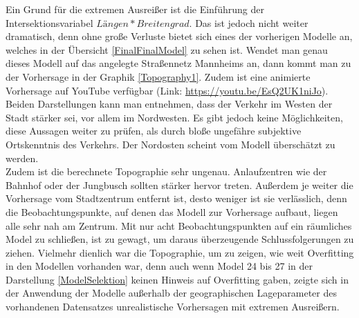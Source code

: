 \documentclass[a4paper,12pt]{thesis}
\begin{document}
Ein Grund für die extremen Ausreißer ist die Einführung der Intersektionsvariabel $Längen*Breitengrad$. Das ist jedoch nicht weiter dramatisch, denn ohne große Verluste bietet sich eines der vorherigen Modelle an, welches in der Übersicht \ref{FinalFinalModel} zu sehen ist. Wendet man genau dieses Modell auf das angelegte Straßennetz Mannheims an, dann kommt man zu der Vorhersage in der Graphik \ref{Topography1}. Zudem ist eine animierte Vorhersage auf YouTube verfügbar (Link: \url{https://youtu.be/EsQ2UK1niJo}). Beiden Darstellungen kann man entnehmen, dass der Verkehr im Westen der Stadt stärker sei, vor allem im Nordwesten. Es gibt jedoch keine Möglichkeiten, diese Aussagen weiter zu prüfen, als durch bloße ungefähre subjektive Ortskenntnis des Verkehrs. Der Nordosten scheint vom Modell überschätzt zu werden.\\
Zudem ist die berechnete Topographie sehr ungenau. Anlaufzentren wie der Bahnhof oder der Jungbusch sollten stärker hervor treten. Außerdem je weiter die Vorhersage vom Stadtzentrum entfernt ist, desto weniger ist sie verlässlich, denn die Beobachtungspunkte, auf denen das Modell zur Vorhersage aufbaut, liegen alle sehr nah am Zentrum. Mit nur acht Beobachtungspunkten auf ein räumliches Model zu schließen, ist zu gewagt, um daraus überzeugende Schlussfolgerungen zu ziehen. Vielmehr dienlich war die Topographie, um zu zeigen, wie weit Overfitting in den Modellen vorhanden war, denn auch wenn Model 24 bis 27 in der Darstellung \ref{ModelSelektion} keinen Hinweis auf Overfitting gaben, zeigte sich in der Anwendung der Modelle außerhalb der geographischen Lageparameter des vorhandenen Datensatzes unrealistische Vorhersagen mit extremen Ausreißern.
\end{document}
